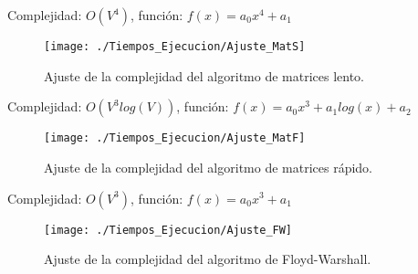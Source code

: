 \newpage

Complejidad: $O(V^4)$, función: $f(x) = a_0x^4 + a_1$

\begin{figure}[!htb]
	\centering
	\texttt{[image: ./Tiempos\_Ejecucion/Ajuste\_MatS]}
	
	\caption{Ajuste de la complejidad del algoritmo de matrices lento.}
	\label{fig:ajuste_MatS}
\end{figure}

Complejidad: $O(V^3log(V))$, función: $f(x) = a_0x^3 + a_1log(x) + a_2$

\begin{figure}[!htb]
	\centering
	\texttt{[image: ./Tiempos\_Ejecucion/Ajuste\_MatF]}
	
	\caption{Ajuste de la complejidad del algoritmo de matrices rápido.}
	\label{fig:ajuste_MatF}
\end{figure}

Complejidad: $O(V^3)$, función: $f(x) = a_0x^3 + a_1$

\begin{figure}[!htb]
	\centering
	\texttt{[image: ./Tiempos\_Ejecucion/Ajuste\_FW]}
	
	\caption{Ajuste de la complejidad del algoritmo de Floyd-Warshall.}
	\label{fig:ajuste_FW}
\end{figure}

\endinput



